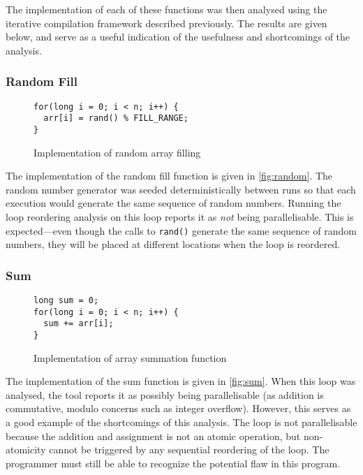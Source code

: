 \documentclass[journal]{IEEEtran}
\begin{document}
The implementation of each of these functions was then analysed using the
iterative compilation framework described previously. The results are given
below, and serve as a useful indication of the usefulness and shortcomings of
the analysis.

\subsubsection{Random Fill}

\begin{figure}[h]
  \centering
  \begin{lstlisting}
for(long i = 0; i < n; i++) {
  arr[i] = rand() % FILL_RANGE;
}
  \end{lstlisting}
  \caption{Implementation of random array filling}
  \label{fig:random}
\end{figure}

The implementation of the random fill function is given in \autoref{fig:random}.
The random number generator was seeded deterministically between runs so that
each execution would generate the same sequence of random numbers. Running the
loop reordering analysis on this loop reports it as \emph{not} being
parallelisable. This is expected---even though the calls to \texttt{rand()}
generate the same sequence of random numbers, they will be placed at different
locations when the loop is reordered.

\subsubsection{Sum}

\begin{figure}[h]
  \centering
  \begin{lstlisting}
long sum = 0;
for(long i = 0; i < n; i++) {
  sum += arr[i];
}
  \end{lstlisting}
  \caption{Implementation of array summation function}
  \label{fig:sum}
\end{figure}

The implementation of the sum function is given in \autoref{fig:sum}. When this
loop was analysed, the tool reports it as possibly being parallelisable (as
addition is commutative, modulo concerns such as integer overflow). However,
this serves as a good example of the shortcomings of this analysis. The loop is
not parallelisable because the addition and assignment is not an atomic
operation, but non-atomicity cannot be triggered by any sequential reordering of
the loop. The programmer must still be able to recognize the potential flaw in
this program.
\end{document}
